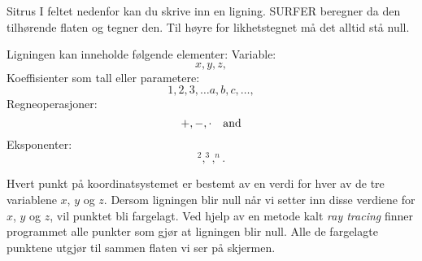 \begin{surferPage}{Sitrus}
I feltet nedenfor kan du skrive inn en ligning. SURFER beregner da den tilhørende flaten og tegner den. 
Til høyre for likhetstegnet må det alltid stå null. 

Ligningen kan inneholde følgende elementer:
\newline
Variable:
\[x, y, z, \]
Koeffisienter som tall eller parametere:
\[1, 2, 3, \dots a, b, c, \dots, \]
Regneoperasjoner:
\[+,  - , \cdot \quad \textnormal{and} \]
Eksponenter:
\[ ^2, ^3, ^n .\]

Hvert punkt på koordinatsystemet er bestemt av en verdi for hver av de tre variablene $x$, $y$ og $z$. 
Dersom ligningen blir null når vi setter inn disse verdiene for $x$, $y$ og $z$, vil punktet bli fargelagt. 
Ved hjelp av en metode kalt \textit{ray tracing} finner programmet alle punkter som gjør at ligningen blir null. 
Alle de fargelagte punktene utgjør til sammen flaten vi ser på skjermen.
\end{surferPage}
